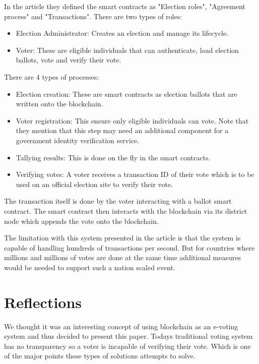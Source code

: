 In the article they defined the smart contracts as "Election roles",
"Agreement process" and "Transactions". There are two types of roles:

\begin{itemize}
  \item Election Administrator: Creates an election and manage its lifecycle.
  \item Voter: These are eligible individuals that can authenticate, load election
ballots, vote and verify their vote.
\end{itemize}

There are 4 types of processes:

\begin{itemize}
  \item Election creation: These are smart contracts as election ballots that
are written onto the blockchain.
  \item Voter registration: This ensure only eligible individuals can vote.
Note that they mention that this step may need an additional component for
a government identity verification service.
  \item Tallying results: This is done on the fly in the smart contracts.
  \item Verifying votes: A voter receives a transaction ID of their vote which is
to be used on an official election site to verify their vote.
\end{itemize}

The transaction itself is done by the voter interacting with a ballot smart contract.
The smart contract then interacts with the blockchain via its district node which
appends the vote onto the blockchain.

The limitation with this system presented in the article is that the system is
capable of handling hundreds of transactions per second. But for countries where
millions and millions of votes are done at the same time additional measures would
be needed to support such a nation scaled event.

\section{Reflections}\label{sec:reflections}
We thought it was an interesting concept of using blockchain as an e-voting system
and thus decided to present this paper. Todays traditional voting system has no transparency
so a voter is incapable of verifying their vote. Which is one of the major points these types
of solutions attempts to solve.
